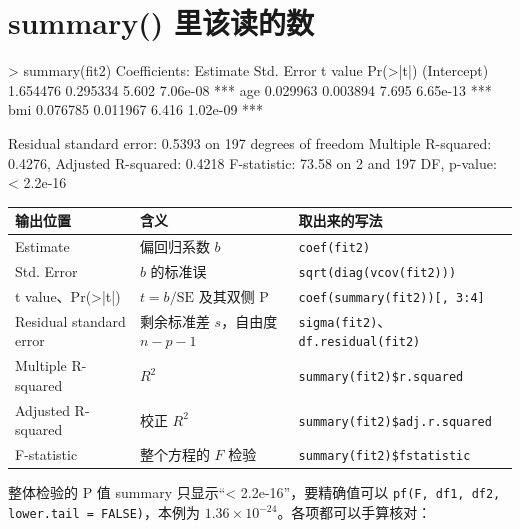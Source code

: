 \section{summary() 里该读的数}
\begin{routput}
> summary(fit2)
Coefficients:
            Estimate Std. Error t value Pr(>|t|)
(Intercept) 1.654476   0.295334   5.602 7.06e-08 ***
age         0.029963   0.003894   7.695 6.65e-13 ***
bmi         0.076785   0.011967   6.416 1.02e-09 ***

Residual standard error: 0.5393 on 197 degrees of freedom
Multiple R-squared:  0.4276,	Adjusted R-squared:  0.4218
F-statistic: 73.58 on 2 and 197 DF,  p-value: < 2.2e-16
\end{routput}


\begin{tabular}{lll}
\toprule
输出位置 & 含义 & 取出来的写法\\
\midrule
Estimate & 偏回归系数 $b$ & \Verb|coef(fit2)|\\
Std. Error & $b$ 的标准误 & \Verb|sqrt(diag(vcov(fit2)))|\\
t value、Pr(>|t|) & $t=b/\mathrm{SE}$ 及其双侧 P & \Verb|coef(summary(fit2))[, 3:4]|\\
Residual standard error & 剩余标准差 $s$，自由度 $n-p-1$ & \Verb|sigma(fit2)|、\Verb|df.residual(fit2)|\\
Multiple R-squared & $R^2$ & \Verb|summary(fit2)$r.squared|\\
Adjusted R-squared & 校正 $R^2$ & \Verb|summary(fit2)$adj.r.squared|\\
F-statistic & 整个方程的 $F$ 检验 & \Verb|summary(fit2)$fstatistic|\\
\bottomrule
\end{tabular}


整体检验的 P 值 summary 只显示“< 2.2e-16”，要精确值可以 \Verb|pf(F, df1, df2, lower.tail = FALSE)|，本例为 $1.36\times10^{-24}$。各项都可以手算核对：


